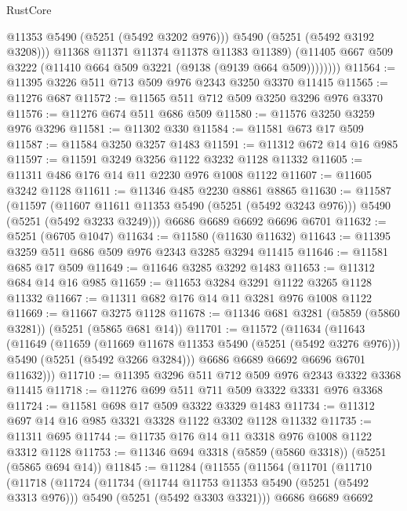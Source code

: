 \begin{lexlean}{RustCore}
\begin{coremodule}
                  @11353
                  @5490
                  (@5251 (@5492 @3202 @976)))
                @5490
                (@5251 (@5492 @3192 @3208)))
              @11368
              @11371
              @11374
              @11378
              @11383
              @11389)
            (@11405 @667 @509 @3222 (@11410 @664 @509 @3221 (@9138 (@9139 @664 @509))))))))
@11564 := @11395 @3226 @511 @713 @509 @976 @2343 @3250 @3370 @11415
@11565 := @11276 @687
@11572 := @11565 @511 @712 @509 @3250 @3296 @976 @3370
@11576 := @11276 @674 @511 @686 @509
@11580 := @11576 @3250 @3259 @976 @3296
@11581 := @11302 @330
@11584 := @11581 @673 @17 @509
@11587 := @11584 @3250 @3257 @1483
@11591 := @11312 @672 @14 @16 @985
@11597 := @11591 @3249 @3256 @1122 @3232 @1128 @11332
@11605 := @11311 @486 @176 @14 @11 @2230 @976 @1008 @1122
@11607 := @11605 @3242 @1128
@11611 := @11346 @485 @2230 @8861 @8865
@11630 := @11587
    (@11597
      (@11607 @11611 @11353 @5490 (@5251 (@5492 @3243 @976)))
      @5490
      (@5251 (@5492 @3233 @3249)))
    @6686
    @6689
    @6692
    @6696
    @6701
@11632 := @5251 (@6705 @1047)
@11634 := @11580 (@11630 @11632)
@11643 := @11395 @3259 @511 @686 @509 @976 @2343 @3285 @3294 @11415
@11646 := @11581 @685 @17 @509
@11649 := @11646 @3285 @3292 @1483
@11653 := @11312 @684 @14 @16 @985
@11659 := @11653 @3284 @3291 @1122 @3265 @1128 @11332
@11667 := @11311 @682 @176 @14 @11 @3281 @976 @1008 @1122
@11669 := @11667 @3275 @1128
@11678 := @11346 @681 @3281 (@5859 (@5860 @3281)) (@5251 (@5865 @681 @14))
@11701 := @11572
    (@11634
      (@11643
        (@11649
          (@11659
            (@11669 @11678 @11353 @5490 (@5251 (@5492 @3276 @976)))
            @5490
            (@5251 (@5492 @3266 @3284)))
          @6686
          @6689
          @6692
          @6696
          @6701
          @11632)))
@11710 := @11395 @3296 @511 @712 @509 @976 @2343 @3322 @3368 @11415
@11718 := @11276 @699 @511 @711 @509 @3322 @3331 @976 @3368
@11724 := @11581 @698 @17 @509 @3322 @3329 @1483
@11734 := @11312 @697 @14 @16 @985 @3321 @3328 @1122 @3302 @1128 @11332
@11735 := @11311 @695
@11744 := @11735 @176 @14 @11 @3318 @976 @1008 @1122 @3312 @1128
@11753 := @11346 @694 @3318 (@5859 (@5860 @3318)) (@5251 (@5865 @694 @14))
@11845 := @11284
    (@11555
      (@11564
        (@11701
          (@11710
            (@11718
              (@11724
                (@11734
                  (@11744 @11753 @11353 @5490 (@5251 (@5492 @3313 @976)))
                  @5490
                  (@5251 (@5492 @3303 @3321)))
                @6686
                @6689
                @6692

\end{coremodule}
\end{lexlean}
